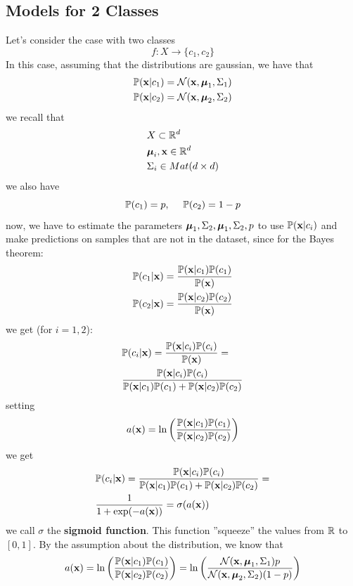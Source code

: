 \documentclass[10pt, letterpaper]{report}
\begin{document}
\subsection{Models for 2 Classes}
Let's consider the case with two classes
$$ 
f:X\rightarrow\{c_1,c_2\}
$$
In this case, assuming that the distributions are gaussian, we have that\begin{align}
    &{\mathbb P}(\mathbf x|c_1)=\mathcal N(\mathbf x,{\boldsymbol{\mu}}_1,\Sigma_1)\\
    &{\mathbb P}(\mathbf x|c_2)=\mathcal N(\mathbf x,{\boldsymbol{\mu}}_2,\Sigma_2)
\end{align}
we recall that\begin{align}
    &X\subset {\mathbb R}^d\\ 
    &{\boldsymbol{\mu}}_i,\mathbf x\in{\mathbb R}^d\\
    &\Sigma_i\in Mat(d\times d)
\end{align}
we also have\begin{equation}
    {\mathbb P}(c_1)=p,  \ \ \ \ {\mathbb P}(c_2)=1-p
\end{equation}
now, we have to estimate the parameters ${\boldsymbol{\mu}}_1,\Sigma_2,{\boldsymbol{\mu}}_1,\Sigma_2,p$ to use ${\mathbb P}(\mathbf x|c_i)$ and make predictions on samples that are not in the dataset, since for the Bayes theorem:\begin{align}
    &{\mathbb P}(c_1|\mathbf x)=\frac{{\mathbb P}(\mathbf x|c_1){\mathbb P}(c_1)}{{\mathbb P}(\mathbf x)}\\
    &{\mathbb P}(c_2|\mathbf x)=\frac{{\mathbb P}(\mathbf x|c_2){\mathbb P}(c_2)}{{\mathbb P}(\mathbf x)}
\end{align}
we get (for $i=1,2$):\begin{align}
    &{\mathbb P}(c_i|\mathbf x)=\frac{{\mathbb P}(\mathbf x|c_i){\mathbb P}(c_i)}{{\mathbb P}(\mathbf x)}=\\
    &\frac{{\mathbb P}(\mathbf x|c_i){\mathbb P}(c_i)}{{\mathbb P}(\mathbf x|c_1){\mathbb P}(c_1)+{\mathbb P}(\mathbf x|c_2){\mathbb P}(c_2)}
\end{align}
setting
\begin{equation}
    a(\mathbf x)=\ln\left(\frac{{\mathbb P}(\mathbf x|c_1){\mathbb P}(c_1)}{{\mathbb P}(\mathbf x|c_2){\mathbb P}(c_2)}\right)
\end{equation}
we get\begin{align}
    &{\mathbb P}(c_i|\mathbf x)=\frac{{\mathbb P}(\mathbf x|c_i){\mathbb P}(c_i)}{{\mathbb P}(\mathbf x|c_1){\mathbb P}(c_1)+{\mathbb P}(\mathbf x|c_2){\mathbb P}(c_2)}=\\
    &\frac{1}{1+\exp(-a(\mathbf x))}=\sigma(a(\mathbf x))
\end{align}
we call  $\sigma$ the \textbf{sigmoid function}. This function ''squeeze'' the values from ${\mathbb R}$ to $[0,1]$. By the assumption about the distribution, we know that\begin{equation}
    a(\mathbf x)=\ln\left(\frac{{\mathbb P}(\mathbf x|c_1){\mathbb P}(c_1)}{{\mathbb P}(\mathbf x|c_2){\mathbb P}(c_2)}\right)=
\ln\left(\frac{\mathcal N(\mathbf x,{\boldsymbol{\mu}}_1,\Sigma_1)p}{\mathcal N(\mathbf x,{\boldsymbol{\mu}}_2,\Sigma_2)(1-p)}\right)
\end{equation}
\end{document}
